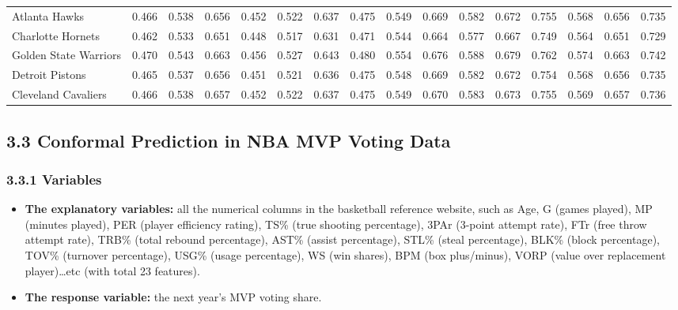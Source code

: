 \documentclass[11pt,a4paper]{article}
\begin{document}
\begin{table}[H]
\begin{tabular}{l ccc ccc ccc ccc ccc}
Atlanta Hawks & 0.466 & 0.538 & 0.656 & 0.452 & 0.522 & 0.637 & 0.475 & 0.549 & 0.669 & 0.582 & 0.672 & 0.755 & 0.568 & 0.656 & 0.735 \\
Charlotte Hornets & 0.462 & 0.533 & 0.651 & 0.448 & 0.517 & 0.631 & 0.471 & 0.544 & 0.664 & 0.577 & 0.667 & 0.749 & 0.564 & 0.651 & 0.729 \\
Golden State Warriors & 0.470 & 0.543 & 0.663 & 0.456 & 0.527 & 0.643 & 0.480 & 0.554 & 0.676 & 0.588 & 0.679 & 0.762 & 0.574 & 0.663 & 0.742 \\
Detroit Pistons & 0.465 & 0.537 & 0.656 & 0.451 & 0.521 & 0.636 & 0.475 & 0.548 & 0.669 & 0.582 & 0.672 & 0.754 & 0.568 & 0.656 & 0.735 \\
Cleveland Cavaliers & 0.466 & 0.538 & 0.657 & 0.452 & 0.522 & 0.637 & 0.475 & 0.549 & 0.670 & 0.583 & 0.673 & 0.755 & 0.569 & 0.657 & 0.736 \\
\bottomrule
\end{tabular}
\end{table}

\subsection{3.3 Conformal Prediction in NBA MVP Voting Data}

\subsubsection{3.3.1 Variables}
\begin{itemize}
    \item \textbf{The explanatory variables:} all the numerical columns in the basketball reference website, such as Age, G (games played), MP (minutes played), PER (player efficiency rating), TS\% (true shooting percentage), 3PAr (3-point attempt rate), FTr (free throw attempt rate), TRB\% (total rebound percentage), AST\% (assist percentage), STL\% (steal percentage), BLK\% (block percentage), TOV\% (turnover percentage), USG\% (usage percentage), WS (win shares), BPM (box plus/minus), VORP (value over replacement player)\dots etc (with total 23 features).
    
    \item \textbf{The response variable:} the next year's MVP voting share.
\end{itemize}
\end{document}
